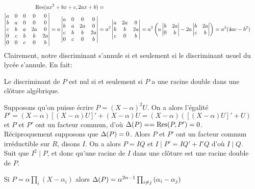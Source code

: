 \documentclass{article}
\begin{document}
\begin{align*}
\textrm{Res}(ax^2 + bx + c, 2ax + b) &=\\
\begin{vmatrix}
a & 0 & 0 & 0  & 0 \\
b & a & 0 & 0  & 0 \\
c & b & a & 2a & 0 \\
0 & c & b & b  & 2a\\
0 & 0 & c & 0  & b
\end{vmatrix} 
= a\begin{vmatrix}
a & 0 & 0  & 0 \\
b & a & 2a & 0 \\
c & b & b  & 2a\\
0 & c & 0  & b
\end{vmatrix}
&= a^2\begin{vmatrix}
a & 2a & 0 \\
b & b  & 2a\\
c & 0  & b
\end{vmatrix}
= a^2\left(a\begin{vmatrix}
b  & 2a\\
0  & b
\end{vmatrix} - 2a\begin{vmatrix}
b & 2a\\
c & b
\end{vmatrix}\right)
= a^3(4ac - b^2)
\end{align*}
Clairement, notre discriminant s'annule si et seulement si le discriminant usuel du lycée s'annule. En fait:
\begin{proposition}
Le discriminant de $P$ est nul si et seulement si $P$ a une racine double dans une clôture algébrique.
\end{proposition}

\begin{preuve}
Supposons qu'on puisse écrire $P = (X-\alpha)^2U$. On a alors l'égalité 
$$P' = (X-\alpha)[(X-\alpha)U]' + (X-\alpha)U = (X-\alpha)([(X-\alpha)U]' + U)$$
et $P$ et $P'$ ont un facteur commun, d'où $\Delta(P) = = \textrm{Res}(P, P') = 0$.\\
Réciproquement supposons que $\Delta(P) = 0$. Alors $P$ et $P'$ ont un facteur commun irréductible sur $R$, disons $I$. On a alors $P = IQ$ et $I \mid P' = IQ' + I'Q$ d'où $I \mid Q$. Suit que $I^2 \mid P$, et donc qu'une racine de $I$ dans une clôture est une racine double de $P$.
\end{preuve}

\begin{proposition}
Si $P = \alpha\prod_{i}{(X-\alpha_i)}$ alors $\Delta(P) = \alpha^{2n-1}\prod_{i \neq j}{(\alpha_i-\alpha_j)}$
\end{proposition}
\end{document}
